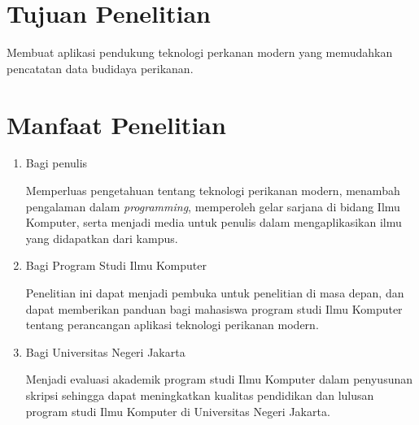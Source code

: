 \section{Tujuan Penelitian}

 Membuat aplikasi pendukung teknologi perkanan modern yang memudahkan pencatatan data budidaya perikanan.

\section{Manfaat Penelitian}
\begin{enumerate}
	\item Bagi penulis
		
	Memperluas pengetahuan tentang teknologi perikanan modern, menambah pengalaman dalam \textit{programming}, memperoleh gelar sarjana di bidang Ilmu Komputer, serta menjadi media untuk penulis dalam mengaplikasikan ilmu yang didapatkan dari kampus.
		
	\item Bagi Program Studi Ilmu Komputer
	 	
	Penelitian ini dapat menjadi pembuka untuk penelitian di masa depan, dan dapat memberikan panduan bagi mahasiswa program studi Ilmu Komputer tentang perancangan aplikasi teknologi perikanan modern.
	
	\item Bagi Universitas Negeri Jakarta
	 	
	Menjadi evaluasi akademik program studi Ilmu Komputer dalam penyusunan skripsi sehingga dapat meningkatkan kualitas pendidikan dan lulusan program studi Ilmu Komputer di Universitas Negeri Jakarta.
	 			
\end{enumerate}

